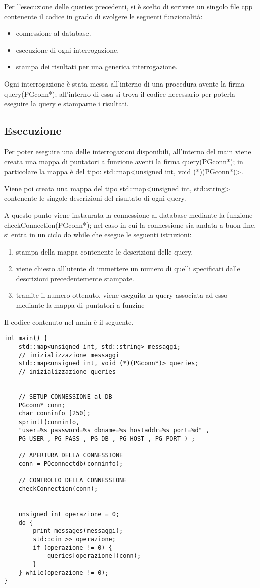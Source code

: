 \documentclass[11pt]{article}
\begin{document}
Per l'esecuzione delle queries precedenti, si è scelto di scrivere un singolo file cpp contenente il codice in grado di svolgere le seguenti funzionalità:   
\begin{itemize}
	\item connessione al database.
	\item esecuzione di ogni interrogazione.
	\item stampa dei risultati per una generica interrogazione.
\end{itemize}

Ogni interrogazione è stata messa all'interno di una procedura avente la firma query(PGconn*); all'interno di essa si trova il codice necessario per poterla eseguire la query e stamparne i risultati.

\subsection{Esecuzione}

Per poter eseguire una delle interrogazioni disponibili, all'interno del main viene creata una mappa di puntatori a funzione aventi la firma query(PGconn*); in particolare la mappa è del tipo: std::map<unsigned int, void (*)(PGconn*)>.

Viene poi creata una mappa del tipo std::map<unsigned int, std::string> contenente le singole descrizioni del risultato di ogni query.

A questo punto viene instaurata la connessione al database mediante la funzione checkConnection(PGconn*); nel caso in cui la connessione sia andata a buon fine, si entra in un ciclo do while che esegue le seguenti istruzioni:

\begin{enumerate}
	\item stampa della mappa contenente le descrizioni delle query.
	\item viene chiesto all'utente di immettere un numero di quelli specificati dalle descrizioni precedentemente stampate.
	\item tramite il numero ottenuto, viene eseguita la query associata ad esso mediante la mappa di puntatori a funzine
\end{enumerate}

Il codice contenuto nel main è il seguente.

\begin{lstlisting}
int main() {
	std::map<unsigned int, std::string> messaggi;
	// inizializzazione messaggi
	std::map<unsigned int, void (*)(PGconn*)> queries;
	// inizializzazione queries 
	
	
	// SETUP CONNESSIONE al DB
	PGconn* conn;
	char conninfo [250];
	sprintf(conninfo, 
	"user=%s password=%s dbname=%s hostaddr=%s port=%d" ,
	PG_USER , PG_PASS , PG_DB , PG_HOST , PG_PORT ) ;
	
	// APERTURA DELLA CONNESSIONE
	conn = PQconnectdb(conninfo);

	// CONTROLLO DELLA CONNESSIONE
	checkConnection(conn);


	unsigned int operazione = 0;
	do {
		print_messages(messaggi);
		std::cin >> operazione;
		if (operazione != 0) {
			queries[operazione](conn);
		}
	} while(operazione != 0);
} 
\end{lstlisting}
\end{document}
